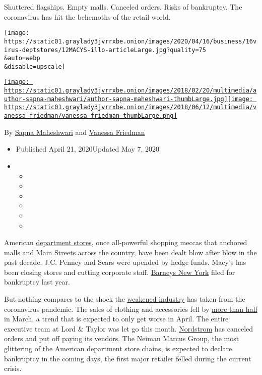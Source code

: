 Shuttered flagships. Empty malls. Canceled orders. Risks of bankruptcy.
The coronavirus has hit the behemoths of the retail world.

\texttt{[image: https://static01.graylady3jvrrxbe.onion/images/2020/04/16/business/16virus-deptstores/12MACYS-illo-articleLarge.jpg?quality=75\\\&auto=webp\\\&disable=upscale]}

\href{https://www.nytimes3xbfgragh.onion/by/sapna-maheshwari}{\texttt{[image: https://static01.graylady3jvrrxbe.onion/images/2018/02/20/multimedia/author-sapna-maheshwari/author-sapna-maheshwari-thumbLarge.jpg]}}\href{https://www.nytimes3xbfgragh.onion/by/vanessa-friedman}{\texttt{[image: https://static01.graylady3jvrrxbe.onion/images/2018/06/12/multimedia/vanessa-friedman/vanessa-friedman-thumbLarge.png]}}

By \href{https://www.nytimes3xbfgragh.onion/by/sapna-maheshwari}{Sapna
Maheshwari} and
\href{https://www.nytimes3xbfgragh.onion/by/vanessa-friedman}{Vanessa
Friedman}

\begin{itemize}
\item
  Published April 21, 2020Updated May 7, 2020
\item
  \begin{itemize}
  \item
  \item
  \item
  \item
  \item
  \item
  \end{itemize}
\end{itemize}

American
\href{https://www.nytimes3xbfgragh.onion/2019/04/12/business/retail-store-closings.html?searchResultPosition=8}{department
stores}, once all-powerful shopping meccas that anchored malls and Main
Streets across the country, have been dealt blow after blow in the past
decade. J.C. Penney and Sears were upended by hedge funds. Macy's has
been closing stores and cutting corporate staff.
\href{https://www.nytimes3xbfgragh.onion/2019/11/01/business/barneys-bankruptcy-authentic-brands.html}{Barneys
New York} filed for bankruptcy last year.

But nothing compares to the shock the
\href{https://www.nytimes3xbfgragh.onion/2020/03/30/business/coronavirus-retail-furloughs-macys.html?searchResultPosition=1}{weakened
industry} has taken from the coronavirus pandemic. The sales of clothing
and accessories fell by
\href{https://www.nytimes3xbfgragh.onion/2020/04/15/business/economy/coronavirus-retail-sales.html?searchResultPosition=1}{more
than half} in March, a trend that is expected to only get worse in
April. The entire executive team at Lord \& Taylor was let go this
month.
\href{https://www.nytimes3xbfgragh.onion/2020/05/14/business/coronavirus-retail-bankruptcies-private-equity.html}{Nordstrom}
has canceled orders and put off paying its vendors. The Neiman Marcus
Group, the most glittering of the American department store chains, is
expected to declare bankruptcy in the coming days, the first major
retailer felled during the current crisis.

